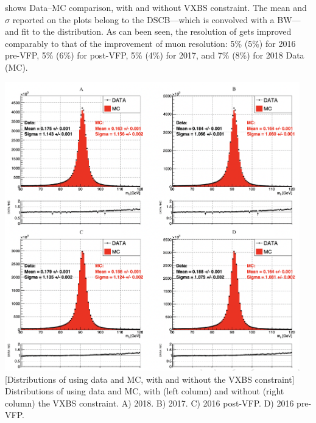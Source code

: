  shows Data--MC comparison, with and without VXBS constraint.
The mean and $\sigma$ reported on the plots belong to the DSCB---which is convolved with a BW---and fit to the distribution.
As can been seen, the resolution of \mll gets improved comparably to that of the improvement of muon \pT resolution:
5\% (5\%) for 2016 pre-VFP,
5\% (6\%) for post-VFP,
5\% (4\%) for 2017, and
7\% (8\%) for 2018 Data (MC).
\begin{multiFigure}
    \centering
        \includegraphics[width=0.96\textwidth]{figures/higgsmassmeas/vxbs/vxbs_mZdist_2017_2018.png}
        [Distributions of \mll using data and MC, with and without the VXBS constraint]
        {Distributions of \mll using data and MC, with (left column) and without (right column) the VXBS constraint. %
        \;A) 2018.
        \;B) 2017.
        \;C) 2016 post-VFP.
        \;D) 2016 pre-VFP.}
    \label{UL_ZBoson_DataMC_comparison_VXBS}
\end{multiFigure}


